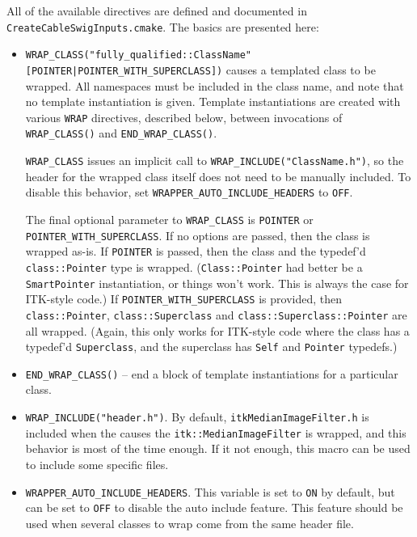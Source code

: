 \documentclass{InsightArticle}
\begin{document}
All of the available directives are defined and documented
in \verb$CreateCableSwigInputs.cmake$. The basics are presented here:

\begin{itemize}
  \item \verb$WRAP_CLASS("fully_qualified::ClassName" [POINTER|POINTER_WITH_SUPERCLASS])$
causes a templated class to be wrapped. All namespaces must be included in the
class name, and note that no template instantiation is given. Template
instantiations are created with various \verb$WRAP$ directives, described below,
between invocations of \verb$WRAP_CLASS()$ and \verb$END_WRAP_CLASS()$.

\verb$WRAP_CLASS$ issues an implicit call to \verb$WRAP_INCLUDE("ClassName.h")$, so the header
for the wrapped class itself does not need to be manually included. To disable
this behavior, set \verb$WRAPPER_AUTO_INCLUDE_HEADERS$ to \verb$OFF$.

The final optional parameter to \verb$WRAP_CLASS$ is \verb$POINTER$ or
\verb$POINTER_WITH_SUPERCLASS$. If no options are passed, then the class is wrapped
as-is. If \verb$POINTER$ is passed, then the class and the typedef'd \verb$class::Pointer$
type is wrapped. (\verb$Class::Pointer$ had better be a \verb$SmartPointer$ instantiation, or
things won't work. This is always the case for ITK-style code.) If
\verb$POINTER_WITH_SUPERCLASS$ is provided, then \verb$class::Pointer$, \verb$class::Superclass$ and
\verb$class::Superclass::Pointer$ are all wrapped. (Again, this only works for
ITK-style code where the class has a typedef'd \verb$Superclass$, and the superclass
has \verb$Self$ and \verb$Pointer$ typedefs.)

  \item \verb$END_WRAP_CLASS()$ -- end a block of template instantiations for a particular
class.

  \item \verb$WRAP_INCLUDE("header.h")$. By default, \verb$itkMedianImageFilter.h$ is included
when the  causes the \verb$itk::MedianImageFilter$ is wrapped, and this behavior is most of the
time enough. If it not enough, this macro can be used to include some specific files.

  \item \verb$WRAPPER_AUTO_INCLUDE_HEADERS$. This variable is set to \verb$ON$ by default, but can
be set to \verb$OFF$ to disable the auto include feature. This feature should be used when several
classes to wrap come from the same header file.


\end{itemize}
\end{document}
